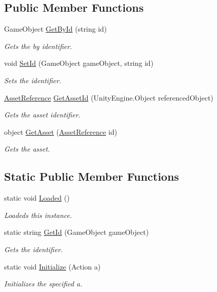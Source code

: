 \subsection*{Public Member Functions}
\begin{DoxyCompactItemize}
\item 
Game\+Object \hyperlink{class_save_game_manager_a9d88574d43e62a55298406671983ce6f}{Get\+By\+Id} (string id)
\begin{DoxyCompactList}\small\item\em Gets the by identifier. \end{DoxyCompactList}\item 
void \hyperlink{class_save_game_manager_a2aefaa6bf188cc28dcc3abb054190ae7}{Set\+Id} (Game\+Object game\+Object, string id)
\begin{DoxyCompactList}\small\item\em Sets the identifier. \end{DoxyCompactList}\item 
\hyperlink{class_save_game_manager_1_1_asset_reference}{Asset\+Reference} \hyperlink{class_save_game_manager_afcaad5363faff9659eb2bdf333d0c7a0}{Get\+Asset\+Id} (Unity\+Engine.\+Object referenced\+Object)
\begin{DoxyCompactList}\small\item\em Gets the asset identifier. \end{DoxyCompactList}\item 
object \hyperlink{class_save_game_manager_adb67cfcda8b5ebc7a06daefcbe04a87e}{Get\+Asset} (\hyperlink{class_save_game_manager_1_1_asset_reference}{Asset\+Reference} id)
\begin{DoxyCompactList}\small\item\em Gets the asset. \end{DoxyCompactList}\end{DoxyCompactItemize}
\subsection*{Static Public Member Functions}
\begin{DoxyCompactItemize}
\item 
static void \hyperlink{class_save_game_manager_a9500107785d79ae915b1b05ae2ab0109}{Loaded} ()
\begin{DoxyCompactList}\small\item\em Loadeds this instance. \end{DoxyCompactList}\item 
static string \hyperlink{class_save_game_manager_a5cd4b817e3cb38c93423546f694bf4f5}{Get\+Id} (Game\+Object game\+Object)
\begin{DoxyCompactList}\small\item\em Gets the identifier. \end{DoxyCompactList}\item 
static void \hyperlink{class_save_game_manager_a235d2f2255aa65272e914ae2adf37e58}{Initialize} (Action a)
\begin{DoxyCompactList}\small\item\em Initializes the specified a. \end{DoxyCompactList}\end{DoxyCompactItemize}
